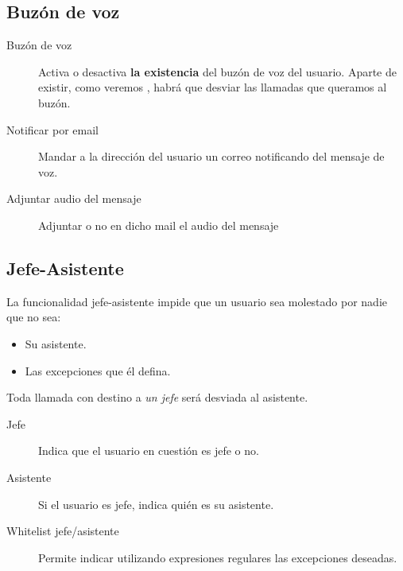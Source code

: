\documentclass[letterpaper,10pt,spanish]{sphinxmanual}
\begin{document}
\subsection{Buzón de voz}
\label{pbx_features/users:buzon-de-voz}
\noindent{}
\begin{description}
\item[{Buzón de voz}] \leavevmode{}\label{pbx_features/users:term-buzon-de-voz}
Activa o desactiva \textbf{la existencia} del buzón de voz del usuario. Aparte de existir, como veremos {\hyperref[pbx_features/users:fwd\string-to\string-vm]{}}, habrá que desviar las llamadas que queramos al buzón.

\item[{Notificar por email}] \leavevmode{}\label{pbx_features/users:term-notificar-por-email}
Mandar a la dirección del usuario un correo notificando del mensaje de voz.

\item[{Adjuntar audio del mensaje}] \leavevmode{}\label{pbx_features/users:term-adjuntar-audio-del-mensaje}
Adjuntar o no en dicho mail el audio del mensaje

\end{description}


\subsection{Jefe-Asistente}
\label{pbx_features/users:jefe-asistente}
\noindent{}

La funcionalidad jefe-asistente impide que un usuario sea molestado por nadie que no sea:
\begin{itemize}
\item {} 
Su asistente.

\item {} 
Las excepciones que él defina.

\end{itemize}

Toda llamada con destino a \emph{un jefe} será desviada al asistente.
\begin{description}
\item[{Jefe}] \leavevmode{}\label{pbx_features/users:term-jefe}
Indica que el usuario en cuestión es jefe o no.

\item[{Asistente}] \leavevmode{}\label{pbx_features/users:term-asistente}
Si el usuario es jefe, indica quién es su asistente.

\item[{Whitelist jefe/asistente}] \leavevmode{}\label{pbx_features/users:term-whitelist-jefe-asistente}
Permite indicar utilizando expresiones regulares las excepciones deseadas.

\end{description}
\end{document}

